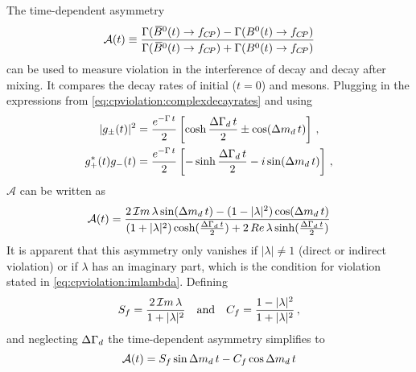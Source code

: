 The time-dependent asymmetry
\begin{equation}
  {\mathcal A}(t) \equiv
    \frac{\Gamma({{\kern 0.18em\overline{\kern -0.18em B}{}}{}^0}(t) \rightarrow f_{{C\!P}}) - \Gamma({{B}^0}(t) \rightarrow f_{{C\!P}})}
         {\Gamma({{\kern 0.18em\overline{\kern -0.18em B}{}}{}^0}(t) \rightarrow f_{{C\!P}}) + \Gamma({{B}^0}(t) \rightarrow f_{{C\!P}})}
\label{eq:cpviolation:asymmetry}
\end{equation}
can be used to measure \CP violation in the interference of decay and decay
after mixing. It compares the decay rates of initial ($t = 0$) \Bdb and \Bd
mesons. Plugging in the expressions from
\cref{eq:cpviolation:complexdecayrates} and using
\begin{align}
\begin{split}
  |g_{\pm}(t)|^2 &= \frac{e^{-\Gamma\,t}}{2}\left[\cosh\frac{{\Delta\Gamma_{{d}}}\,t}{2} \pm \cos({\Delta m_{{d}}}\,t)\right]\,,\\
  g_+^{\ast}(t)g_-(t) &= \frac{e^{-\Gamma\,t}}{2} \left[-\sinh\frac{{\Delta\Gamma_{{d}}}\,t}{2} - i \sin({\Delta m_{{d}}}\,t)\right]\,,
\end{split}
\end{align}
$\mathcal{A}$ can be written as
\begin{align}
  \mathcal{A}(t) = \frac{2\,\mathcal{I}m\,\lambda \sin({\Delta m_{{d}}}\,t) - (1 - |\lambda|^2)\cos({\Delta m_{{d}}}\,t)}{(1 + |\lambda|^2)\cosh(\frac{{\Delta\Gamma_{{d}}}\,t}{2}) + 2\,Re\,\lambda \sinh(\frac{{\Delta\Gamma_{{d}}}\,t}{2})}
\end{align}
It is apparent that this asymmetry only vanishes if $|\lambda| \neq 1$ (direct
or indirect \CP violation) or if $\lambda$ has an imaginary part, which is the
condition for \CP violation stated in \cref{eq:cpviolation:imlambda}. Defining
\begin{align}
  S_{f} = \frac{2\,\mathcal{I}m\,\lambda}{1 + |\lambda|^2} \quad \text{and} \quad C_{f} = \frac{1 - |\lambda|^2}{1 + |\lambda|^2}\,,
\end{align}
and neglecting ${\Delta\Gamma_{{d}}}$ the time-dependent asymmetry simplifies to
\begin{equation}
  \mathcal{A}(t) = S_{f}\sin{\ensuremath{\Delta m_{{d}}}}\,t - C_{f}\cos{\ensuremath{\Delta m_{{d}}}}\,t
\label{eq:cpviolation:simpleasymmetry}
\end{equation}

